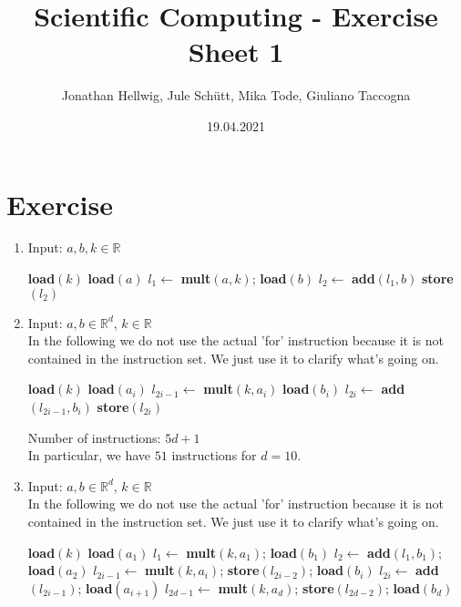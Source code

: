\documentclass{article}
\title{Scientific Computing - Exercise Sheet 1}
\author{Jonathan Hellwig, Jule Schütt, Mika Tode, Giuliano Taccogna}
\date{19.04.2021}
\begin{document}
\maketitle

\section{Exercise}
\begin{enumerate}[label=(\alph*)]
  \item Input: $ a,b,k \in \mathbb{R}$
    \begin{algorithmic}[1]
      \State \textbf{load}$(k)$
      \State \textbf{load}$(a)$
      \State $l_1 \gets $ \textbf{mult}$(a,k)$; \textbf{load}$(b)$
      \State $l_2 \gets $ \textbf{add}$(l_1, b)$
      \State \textbf{store}$(l_2)$
    \end{algorithmic}
  \item Input: $ a,b \in \mathbb{R}^d$, $k \in \mathbb{R}$\\
  In the following we do not use the actual 'for' instruction because it is not contained in the instruction set. We just use it to clarify what's going on. 
    \begin{algorithmic}[1]
      \State \textbf{load}$(k)$
      \State \textbf{load}$(a_i)$
      \State $l_{2i-1} \gets $ \textbf{mult}$(k, a_i)$
      \State \textbf{load}$(b_i)$
      \State $l_{2i} \gets $ \textbf{add}$(l_{2i-1}, b_i)$
      \State \textbf{store}$(l_{2i})$
      \EndFor
    \end{algorithmic}
    Number of instructions: $5d+1$ \\
    In particular, we have $51$ instructions for $d = 10$.
  \item Input: $ a,b \in \mathbb{R}^d$, $k \in \mathbb{R}$\\
    In the following we do not use the actual 'for' instruction because it is not contained in the instruction set. We just use it to clarify what's going on. 
    \begin{algorithmic}[1]
      \State \textbf{load}$(k)$
      \State \textbf{load}$(a_1)$
      \State $l_1 \gets $ \textbf{mult}$(k,a_1)$; \textbf{load}$(b_1)$
      \State $l_2 \gets $ \textbf{add}$(l_1, b_1)$; \textbf{load}$(a_2)$
      \State $l_{2i-1} \gets $ \textbf{mult}$(k,a_i)$; \textbf{store}$(l_{2i-2})$; \textbf{load}$(b_i)$
      \State $l_{2i} \gets $ \textbf{add}$(l_{2i-1})$; \textbf{load}$(a_{i+1})$
      \EndFor
      \State $l_{2d-1} \gets $ \textbf{mult}$(k,a_d)$; \textbf{store}$(l_{2d-2})$; \textbf{load}$(b_d)$

\end{algorithmic}
\end{enumerate}
\end{document}
